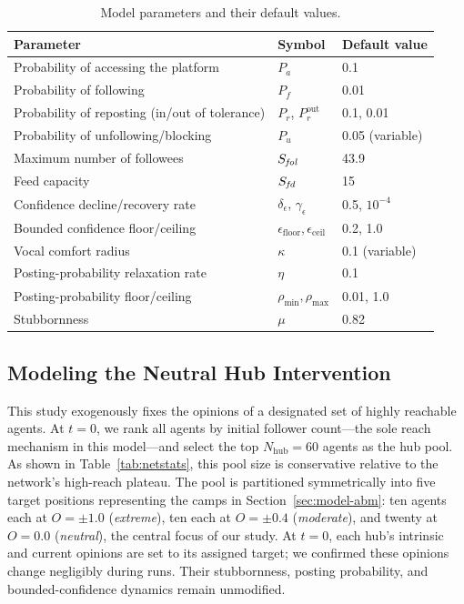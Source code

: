 \documentclass{svproc}
\def\Black{\color[rgb]{0,0,0}}
\def\post{\rho}                 %
\def\BoundedConfidence{\epsilon} %
\def\Stubbornness{\mu}           %
\def\maxfollower{S_{\it fol}}    %
\def\maxfeed{S_{\it fd}}         %
\def\VCR{\kappa}                 %
\begin{document}
\begin{table}[t]
\centering
\caption{Model parameters and their default values.}\label{tab:param}
\tabcolsep=5pt
\begin{tabular}{lll}
\toprule
Parameter & Symbol & Default value \\
\midrule
Probability of accessing the platform & $P_a$ & 0.1 \\
Probability of following & $P_f$ & 0.01 \\
Probability of reposting (in/out of tolerance) & $P_r$, $P_r^{\text{out}}$ & 0.1, 0.01 \\
Probability of unfollowing/blocking & $P_u$ & 0.05 (variable) \\
Maximum number of followees & $\maxfollower$ & 43.9 \\
Feed capacity & $\maxfeed$ & 15 \\
Confidence decline/recovery rate & $\delta_{\BoundedConfidence}$, $\gamma_{\BoundedConfidence}$ & 0.5, $10^{-4}$ \\
Bounded confidence floor/ceiling & $\BoundedConfidence_{\mathrm{floor}},\BoundedConfidence_{\mathrm{ceil}}$ & 0.2, 1.0 \\
Vocal comfort radius & $\VCR$ & 0.1 (variable) \\
Posting-probability relaxation rate & $\eta$ & 0.1 \\
Posting-probability floor/ceiling & $\post_{\min},\post_{\max}$ & 0.01, 1.0 \\
Stubbornness & $\Stubbornness$ & 0.82 \\
\bottomrule
\end{tabular}\Black
\end{table}


\subsection{Modeling the Neutral Hub Intervention}\label{sec:model-intervention}
This study exogenously fixes the opinions of a designated set of
highly reachable agents. At $t=0$, we rank all agents by initial
follower count—the sole reach mechanism in this model—and select the
top $N_{\mathrm{hub}}=60$ agents as the hub pool. As shown in
Table~\ref{tab:netstats}, this pool size is conservative relative to
the network's high-reach plateau. The pool is partitioned
symmetrically into five target positions representing the camps in
Section~\ref{sec:model-abm}: ten agents each at $O=\pm1.0$
(\emph{extreme}), ten each at $O=\pm0.4$ (\emph{moderate}), and
twenty at $O=0.0$ (\emph{neutral}), the central focus of our
study. At $t=0$, each hub's intrinsic and current opinions are set to
its assigned target; we confirmed these opinions change negligibly
during runs. Their stubbornness, posting probability, and
bounded-confidence dynamics remain unmodified.
\par
\end{document}

